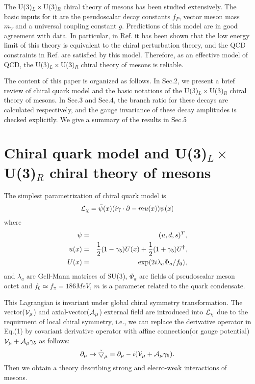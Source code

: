  The U(3)$_L\times$U(3)$_R$ chiral theory of mesons has been studied
extensively{\cite {Li1,Li2,G}}. The basic inputs for it are the 
pseudoscalar decay constants $f_P$, vector meson mass $m_V$ and a
universal coupling constant $g$. Predictions of this model are 
in good agreement with data{\cite {Li1,Li2,G}}. In particular, 
in Ref.{\cite{W}} it has been shown that the low energy limit of this
theory is equivalent to the chiral perturbation theory, and
the QCD constraints in Ref.{\cite {Ec}} are satisfied by this model.
Therefore, as an effective model of QCD, the U(3)$_L\times$U(3)$_R$
chiral theory of mesons is reliable.
 
 
The content of this paper is organized as follows.
In Sec.2, we present a brief review of chiral quark model and the basic
notations of the U(3)$_L\times$U(3)$_R$ chiral theory of mesons.
In Sec.3 and Sec.4, the branch ratio for these decays
are calculated respectively, and the gauge invariance of these decay
amplitudes is checked explicitly. We give a summary of the results in
Sec.5

\section{Chiral quark model and U(3)$_L\times$U(3)$_R$ chiral theory of
mesons}
The simplest parametrization of chiral quark model is\cite{MG} 
\begin{equation} 
{\cal L}_{\chi}=\bar{\psi}(x)(i\gamma\cdot\partial-mu(x))\psi(x) 
\end{equation}   
where 
\begin{eqnarray*} 
\psi&=&(u,d,s)^T, \\
u(x)&=&{1\over 2}(1-\gamma_5)U(x)+{1\over 2}(1+\gamma_5)U^{\dag}, \\ 
U(x)&=&\exp (2i\lambda_a \Phi_a/f_0), 
\end{eqnarray*}   
and $\lambda_a$ are Gell-Mann matrices of SU(3), $\Phi_a$ are fields 
of pseudoscalar meson octet and $f_0 \simeq f_\pi=186MeV$, $m$ 
is a parameter related to the quark condensate.

This Lagrangian is invariant under global chiral symmetry transformation.
 The vector(${\cal V}_\mu$) and axial-vector(${\cal A}_\mu$) external
field are introduced into ${\cal L}_\chi$ due to the requirment of
local chiral symmetry, i.e., we can replace the derivative operator
in Eq.(1) by covariant derivative operator with affine connection(or
gauge potential) ${\cal V}_\mu+{\cal A}_\mu \gamma_5$ as follows:
\begin{eqnarray}
\partial_\mu \rightarrow \tilde {\bigtriangledown}_\mu=\partial_\mu-i({\cal V}_\mu+{\cal
A}_\mu \gamma_5).
\end{eqnarray}
Then we obtain a theory describing strong and elecro-weak interactions
of mesons. 

